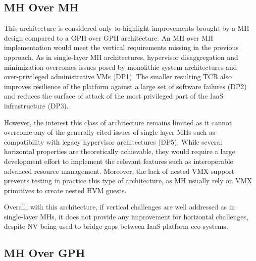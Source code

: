 \documentclass{sig-alternate}
\begin{document}

\subsection{MH Over MH}

\noindent This architecture is considered only to highlight improvements brought by a MH design compared to a GPH over GPH architecture. An MH over MH implementation would meet the vertical requirements missing in the previous approach. 
As in single-layer MH architectures, hypervisor disaggregation and minimization overcomes issues posed by monolithic system architectures and over-privileged administrative VMs (DP1). The smaller resulting TCB also improves resilience of the platform against a large set of software failures (DP2) and reduces the surface of attack of the most privileged part of the IaaS infrastructure (DP3). 

However, the interest this class of architecture remains limited as it cannot overcome any of the generally cited issues of single-layer MHs such as compatibility with legacy hypervisor architectures (DP5). While several horizontal properties are theoretically achievable, they would require a large development effort to implement the relevant features such as interoperable advanced resource management. Moreover, the lack of nested VMX support prevents testing in practice this type of architecture, as MH usually rely on VMX primitives to create nested HVM guests.

Overall, with this architecture, if vertical challenges are well addressed as in single-layer MHs, it does not provide any improvement for horizontal challenges, despite NV being used to bridge gaps between IaaS platform eco-systems.

\subsection{MH Over GPH}
\label{par:mog}
\end{document}
